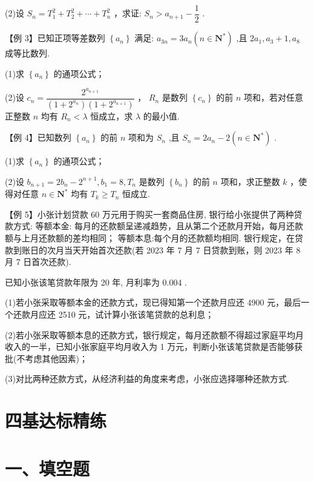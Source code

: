 (2)设 ${S}_{n} = {T}_{1}^{2} + {T}_{2}^{2} + \cdots  + {T}_{n}^{2}$ ，求证: ${S}_{n} > {a}_{n + 1} - \dfrac{1}{2}$ .

【例 3】已知正项等差数列 $\left\{  {a}_{n}\right\}$ 满足: ${a}_{3n} = 3{a}_{n}\left( {n \in  {\mathbf{N}}^{ * }}\right)$ ,且 $2{a}_{1},{a}_{3} + 1,{a}_{8}$ 成等比数列.

(1)求 $\left\{  {a}_{n}\right\}$ 的通项公式；

(2)设 ${c}_{n} = \dfrac{{2}^{{a}_{n + 1}}}{\left( {1 + {2}^{{a}_{n}}}\right) \left( {1 + {2}^{{a}_{n + 1}}}\right) }$ ， ${R}_{n}$ 是数列 $\left\{  {c}_{n}\right\}$ 的前 $n$ 项和，若对任意正整数 $n$ 均有 ${R}_{n} < \lambda$ 恒成立，求 $\lambda$ 的最小值.

【例 4】已知数列 $\left\{  {a}_{n}\right\}$ 的前 $n$ 项和为 ${S}_{n}$ ,且 ${S}_{n} = 2{a}_{n} - 2\left( {n \in  {\mathbf{N}}^{ * }}\right)$ .

(1)求 $\left\{  {a}_{n}\right\}$ 的通项公式；

(2)设 ${b}_{n + 1} = 2{b}_{n} - {2}^{n + 1},{b}_{1} = 8,{T}_{n}$ 是数列 $\left\{  {b}_{n}\right\}$ 的前 $n$ 项和，求正整数 $k$ ，使得对任意 $n \in  {\mathbf{N}}^{ * }$ 均有 ${T}_{k} \geq  {T}_{n}$ 恒成立.

【例 5】小张计划贷款 60 万元用于购买一套商品住房, 银行给小张提供了两种贷款方式:    等额本金: 每月的还款额呈递减趋势，且从第二个还款月开始，每月还款额与上月还款额的差均相同；   等额本息:每个月的还款额均相同. 银行规定，在贷款到账日的次月当天开始首次还款(若 2023 年 7 月 7 日贷款到账，则 2023 年 8 月 7 日首次还款).

已知小张该笔贷款年限为 20 年, 月利率为 0.004 .

(1)若小张采取等额本金的还款方式，现已得知第一个还款月应还 4900 元，最后一个还款月应还 2510 元，试计算小张该笔贷款的总利息；

(2)若小张采取等额本息的还款方式，银行规定，每月还款额不得超过家庭平均月收入的一半，已知小张家庭平均月收入为 1 万元，判断小张该笔贷款是否能够获批(不考虑其他因素)；

(3)对比两种还款方式，从经济利益的角度来考虑，小张应选择哪种还款方式.

\section*{四基达标精练}

\section*{一、填空题}

